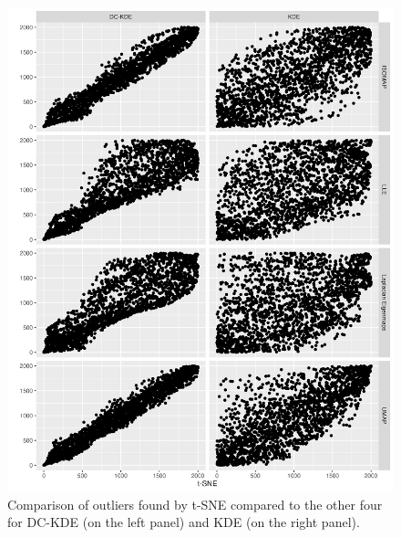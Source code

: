 \documentclass[12pt]{article}
\begin{document}
\begin{figure}

{\centering \includegraphics[width=0.95\linewidth]{figures/Twin Peak2000_density_compare_tsnevs4ml_radius8_r0_5_rank} 

}

\caption{Comparison of outliers found by t-SNE compared to the other four for DC-KDE (on the left panel) and KDE (on the right panel).}\label{fig:tptsnevs4ml}
\end{figure}
\end{document}
